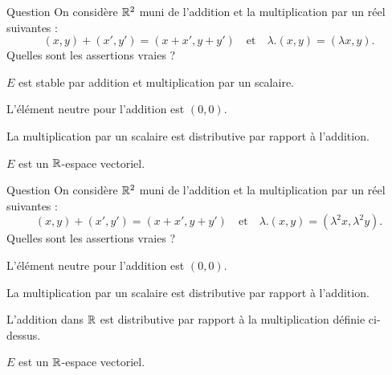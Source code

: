 \begin{multi}[multiple,feedback=
{On vérifie que \(E\) est stable par addition et multiplication par un scalaire, que l'élément neutre 
pour l'addition est \((0,0)\) et que la multiplication par un scalaire est distributive par rapport à l'addition. Par contre, \(E\) n'est pas un espace vectoriel, puisque  \(0.(0,1) = (0,1) \neq (0,0)\).
}]{Question}
On considère \(\mathbb{R}^2\) muni de l'addition et la multiplication par un réel suivantes :
\[(x,y) +  (x',y') = (x+x',y+y')\quad \mbox{et}\quad \lambda .(x,y) = (\lambda x, y).\]
Quelles sont les assertions vraies ?

    \item* \(E\) est stable par addition et multiplication par un scalaire.
    \item* L'élément neutre pour l'addition est \((0,0)\).
    \item* La multiplication par un scalaire est distributive par rapport à l'addition.
    \item \(E\) est un \(\Rr\)-espace vectoriel.
\end{multi}


\begin{multi}[multiple,feedback=
{On vérifie que \(E\) est stable par addition et multiplication par un scalaire, que l'élément neutre 
pour l'addition est \((0,0)\) et que la multiplication par un scalaire est distributive par rapport à l'addition. Par contre, \(E\) n'est pas un espace vectoriel, puisque l'addition dans \(\Rr\) n'est pas distributive par rapport à la multiplication par un élément de \(E\) : 
\((1+1).(0,1) = 2.(0,1) = (0,4),\) mais, \(1.(0,1)+1.(0,1) = (0,1)+(0,1) = (0,2)\).
}]{Question}
On considère \(\mathbb{R}^2\) muni de l'addition et la multiplication par un réel suivantes :
\[(x,y) +  (x',y') = (x+x',y+y')\quad \mbox{et}\quad \lambda .(x,y) = (\lambda^2 x, \lambda^2 y).\]
Quelles sont les assertions vraies ?

    \item* L'élément neutre pour l'addition est \((0,0)\).
    \item* La multiplication par un scalaire est distributive par rapport à l'addition.
    \item L'addition dans \(\Rr\) est distributive par rapport à la multiplication définie ci-dessus.
    \item \(E\) est un \(\Rr\)-espace vectoriel.
\end{multi}


